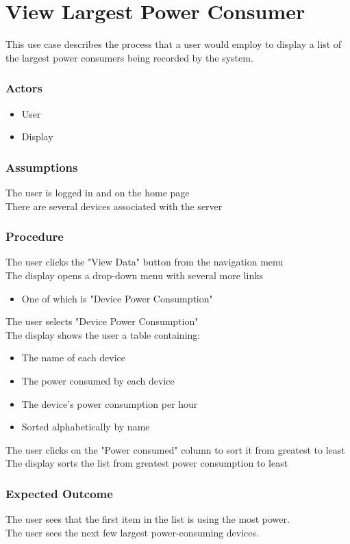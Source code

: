 \section{View Largest Power Consumer}
This use case describes the process that a user would employ to display a list of the largest power consumers being recorded by the system.
\subsubsection{Actors}
\begin{itemize}
	\item User
	\item Display
\end{itemize}

\subsubsection{Assumptions}

The user is logged in and on the home page\\
There are several devices associated with the server 

\subsubsection{Procedure}

The user clicks the "View Data" button from the navigation menu\\
The display opens a drop-down menu with several more links
\begin{itemize}
	\item One of which is "Device Power Consumption" 
\end{itemize}
The user selects "Device Power Consumption"\\
The display shows the user a table containing:
\begin{itemize}
	\item The name of each device
	\item The power consumed by each device
	\item The device's power consumption per hour
	\item Sorted alphabetically by name 
\end{itemize}
The user clicks on the "Power consumed" column to sort it from greatest to least\\
The display sorts the list from greatest power consumption to least

\subsubsection{Expected Outcome}

The user sees that the first item in the list is using the most power.\\
The user sees the next few largest power-consuming devices.